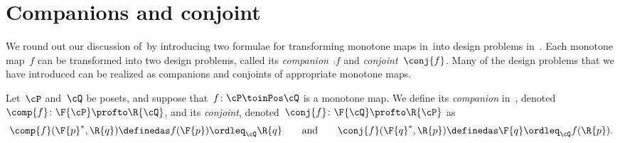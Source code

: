 

\section{Companions and conjoint}
We round out our discussion of~\DP by introducing two formulae for transforming monotone maps in~\Pos into design problems in~\DP. Each monotone map~$f$ can be transformed into two design problems, called its \emph{companion}~$\comp{f}$ and \emph{conjoint}~$\conj{f}$. Many of the design problems that we have introduced can be realized as companions and conjoints of appropriate monotone maps.

\begin{definition}
  \label{def:comp_conj}
  Let~$\cP$ and~$\cQ $ be posets, and suppose that~$f\colon\cP \toinPos \cQ $ is a monotone map. We define its \emph{companion} in~\DP, denoted~$\comp{f}\colon \F{\cP} \profto \R{\cQ}$,
  and its \emph{conjoint}, denoted~$\conj{f}\colon \F{\cQ} \profto \R{\cP}$ as
  \begin{equation}
    \comp{f}(\F{p}^*,\R{q})\definedas f(\F{p}) \ordleq_\cQ \R{q}
    \qquad\text{and}\qquad
    \conj{f}(\F{q}^*,\R{p})\definedas \F{q} \ordleq_\cQ f(\R{p}).
  \end{equation}
\end{definition}

